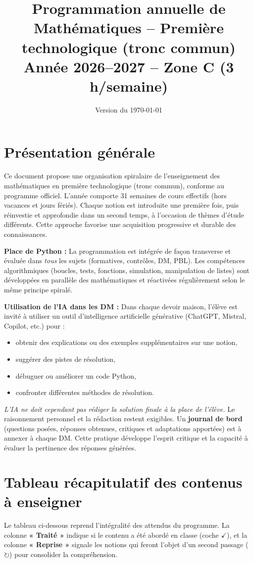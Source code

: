 \documentclass[a4paper,12pt]{article}
\title{Programmation annuelle de Mathématiques -- Première technologique (tronc commun) \\
	Année 2026--2027 -- Zone C (3 h/semaine)}
\author{}
\date{Version du \today}
\newcommand{\fait}{\ensuremath{\checkmark}}
\newcommand{\revoit}{\ensuremath{\circlearrowright}}
\begin{document}
	
	\maketitle
	
	\section*{Présentation générale}
	Ce document propose une organisation spiralaire de l’enseignement des mathématiques en première technologique (tronc commun), conforme au programme officiel. L’année comporte 31 semaines de cours effectifs (hors vacances et jours fériés). Chaque notion est introduite une première fois, puis réinvestie et approfondie dans un second temps, à l’occasion de thèmes d’étude différents. Cette approche favorise une acquisition progressive et durable des connaissances.
	
	\medskip
	\textbf{Place de Python :} La programmation est intégrée de façon transverse et évaluée dans \emph{tous} les sujets (formatives, contrôles, DM, PBL). Les compétences algorithmiques (boucles, tests, fonctions, simulation, manipulation de listes) sont développées en parallèle des mathématiques et réactivées régulièrement selon le même principe spiralé.
	
	\medskip
	\textbf{Utilisation de l’IA dans les DM :} Dans chaque devoir maison, l’élève est invité à utiliser un outil d’intelligence artificielle générative (ChatGPT, Mistral, Copilot, etc.) pour :
	\begin{itemize}
		\item obtenir des explications ou des exemples supplémentaires sur une notion,
		\item suggérer des pistes de résolution,
		\item débuguer ou améliorer un code Python,
		\item confronter différentes méthodes de résolution.
	\end{itemize}
	\emph{L’IA ne doit cependant pas rédiger la solution finale à la place de l’élève.} Le raisonnement personnel et la rédaction restent exigibles. Un \textbf{journal de bord} (questions posées, réponses obtenues, critiques et adaptations apportées) est à annexer à chaque DM. Cette pratique développe l’esprit critique et la capacité à évaluer la pertinence des réponses générées.
	
	\section{Tableau récapitulatif des contenus à enseigner}
	Le tableau ci-dessous reprend l’intégralité des attendus du programme. La colonne \textbf{« Traité »} indique si le contenu a été abordé en classe (coche \fait), et la colonne \textbf{« Reprise »} signale les notions qui feront l’objet d’un second passage (\revoit) pour consolider la compréhension.
	
\end{document}
